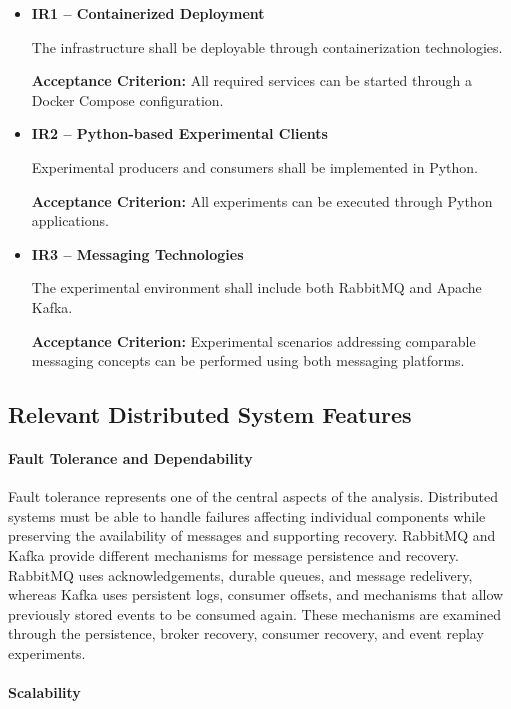 \documentclass{scrartcl}
\begin{document}
\begin{itemize}

\item \textbf{IR1 -- Containerized Deployment}

The infrastructure shall be deployable through containerization technologies.

\textbf{Acceptance Criterion:}
All required services can be started through a Docker Compose configuration.

\item \textbf{IR2 -- Python-based Experimental Clients}

Experimental producers and consumers shall be implemented in Python.

\textbf{Acceptance Criterion:}
All experiments can be executed through Python applications.

\item \textbf{IR3 -- Messaging Technologies}

The experimental environment shall include both RabbitMQ and Apache Kafka.

\textbf{Acceptance Criterion:}
Experimental scenarios addressing comparable messaging concepts can be performed using both messaging platforms.

\end{itemize}
\subsection{Relevant Distributed System Features}
\label{ds-features}


\paragraph{Fault Tolerance and Dependability}

Fault tolerance represents one of the central aspects
of the analysis. Distributed systems must be able to handle failures affecting individual
components while preserving the availability of messages and supporting recovery.
RabbitMQ and Kafka provide different mechanisms for message persistence and recovery.
RabbitMQ uses acknowledgements, durable queues, and message redelivery, whereas Kafka
uses persistent logs, consumer offsets, and mechanisms that allow previously stored
events to be consumed again. These mechanisms are examined through the persistence,
broker recovery, consumer recovery, and event replay experiments.

\paragraph{Scalability}
\end{document}
